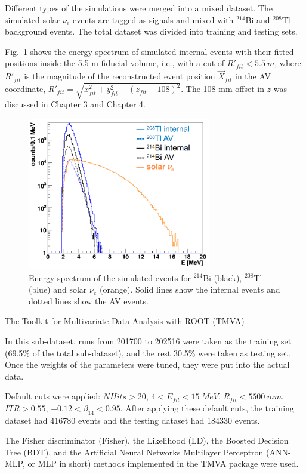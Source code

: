 Different types of the simulations were merged into a mixed dataset. The simulated solar $\nu_e$ events are tagged as signals and mixed with $^{214}$Bi and $^{208}$Tl background events. The total dataset was divided into training and testing sets. 

Fig.~\ref{TMVA_bkgs_1} shows the energy spectrum of simulated internal events with their fitted positions inside the 5.5-m fiducial volume, i.e., with a cut of $R'_{fit}<5.5~m$, where $R'_{fit}$ is the magnitude of the reconstructed event position $\vec{X}_{fit}$ in the AV coordinate, $R'_{fit}=\sqrt{x^2_{fit}+y^2_{fit}+(z_{fit}-108)^2}$. The 108 mm offset in $z$ was discussed in Chapter 3 and Chapter 4. 

\begin{figure}[!htb]
	\centering
	\includegraphics[width=8cm]{TMVA_bkgs_1.png}
	\caption{Energy spectrum of the simulated events for $^{214}$Bi (black), $^{208}$Tl (blue) and solar $\nu_e$ (orange). Solid lines show the internal events and dotted lines show the AV events.}
	\label{TMVA_bkgs_1}
\end{figure}

The Toolkit for Multivariate Data Analysis with ROOT (TMVA) \cite{tmvaWebsite,albertsson2007tmva}

In this sub-dataset, runs from 201700 to 202516 were taken as the training set (69.5\% of the total sub-dataset), and the rest 30.5\% were taken as testing set. Once the weights of the parameters were tuned, they were put into the actual data.

Default cuts were applied: $NHits>20$, $4<E_{fit}<15~MeV$, $R_{fit}<5500~mm$, $ITR>0.55$, $-0.12<\beta_{14}<0.95$.
After applying these default cuts, the training dataset had 416780 events and the testing dataset had 184330 events.

The Fisher discriminator (Fisher), the Likelihood (LD), the Boosted Decision Tree (BDT), and the Artificial Neural Networks Multilayer Perceptron (ANN-MLP, or MLP in short) methods implemented in the TMVA package were used\cite{albertsson2007tmva}.


